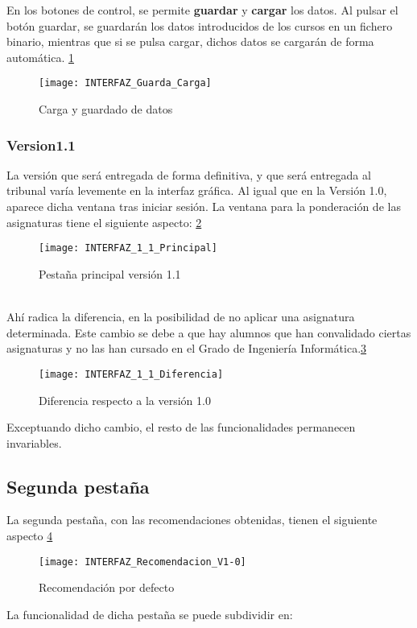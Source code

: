 En los botones de control, se permite \textbf{guardar} y \textbf{cargar} los datos. Al pulsar el botón guardar, se guardarán los datos introducidos de los cursos en un fichero binario, mientras que si se pulsa cargar, dichos datos se cargarán de forma automática. \ref{fig:E.2.5}
\begin{figure}[h]
\centering
\texttt{[image: INTERFAZ\_Guarda\_Carga]}
\caption{Carga y guardado de datos}
\label{fig:E.2.5}
\end{figure}


\subsubsection{Version1.1}
La versión que será entregada de forma definitiva, y que será entregada al tribunal varía levemente en la interfaz gráfica. Al igual que en la Versión 1.0, aparece dicha ventana tras iniciar sesión. La ventana para la ponderación de las asignaturas tiene el siguiente aspecto: \ref{fig:E.2.5.1}
\begin{figure}[h]
\centering
\texttt{[image: INTERFAZ\_1\_1\_Principal]}
\caption{Pestaña principal versión 1.1}
\label{fig:E.2.5.1}
\end{figure}
\\Ahí radica la diferencia, en la posibilidad de no aplicar una asignatura determinada. Este cambio se debe a que hay alumnos que han convalidado ciertas asignaturas y no las han cursado en el Grado de Ingeniería Informática.\ref{fig:E.2.5.2}
\begin{figure}[h]
\centering
\texttt{[image: INTERFAZ\_1\_1\_Diferencia]}
\caption{Diferencia respecto a la  versión 1.0}
\label{fig:E.2.5.2}
\end{figure} 
Exceptuando dicho cambio, el resto de las funcionalidades permanecen invariables. 

\subsection{Segunda pestaña}
La segunda pestaña, con las recomendaciones obtenidas, tienen el siguiente aspecto \ref{fig:E.2.6}
\begin{figure}[h]
\centering
\texttt{[image: INTERFAZ\_Recomendacion\_V1-0]}
\caption{Recomendación por defecto}
\label{fig:E.2.6}
\end{figure}
La funcionalidad de dicha pestaña se puede subdividir en: 
